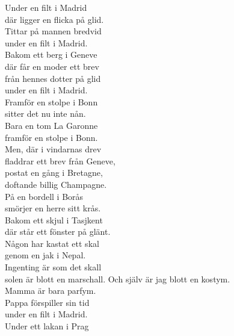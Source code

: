 \documentclass[a6paper,10pt]{article}
\begin{document}
\setlength{\oddsidemargin}{-0.47in}
\begin{center}
\end{center}
\begin{lyrics}
\small Under en filt i Madrid\\ 
där ligger en flicka på glid.\\ 
Tittar på mannen bredvid\\ 
under en filt i Madrid.
\vspace{5pt}\\ 
Bakom ett berg i Geneve\\ 
där får en moder ett brev\\
från hennes dotter på glid\\ 
under en filt i Madrid.
\vspace{5pt}\\  
Framför en stolpe i Bonn\\ 
sitter det nu inte nån.\\ 
Bara en tom La Garonne\\ 
framför en stolpe i Bonn.
\vspace{5pt}\\  
Men, där i vindarnas drev\\ 
fladdrar ett brev från Geneve,\\ 
postat en gång i Bretagne,\\ 
doftande billig Champagne.
\vspace{5pt}\\  
På en bordell i Borås\\ 
smörjer en herre sitt krås.\\ 
Bakom ett skjul i Tasjkent\\ 
där står ett fönster på glänt.
\vspace{5pt}\\  
Någon har kastat ett skal\\ 
genom en jak i Nepal.\\ 
Ingenting är som det skall\\ 
solen är blott en marschall. 
\newpage
\setlength{\oddsidemargin}{-0.37in}
\noindent
Och själv är jag blott en kostym.\\ 
Mamma är bara parfym.\\ 
Pappa förspiller sin tid\\ 
under en filt i Madrid.
\vspace{5pt}\\  
Under ett lakan i Prag\\ 

\end{lyrics}
\end{document}
